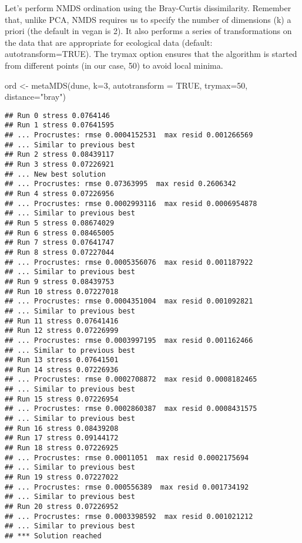 \documentclass[
]{book}
\newenvironment{Shaded}{\begin{snugshade}}{\end{snugshade}}
\newcommand{\AttributeTok}[1]{\textcolor[rgb]{0.77,0.63,0.00}{#1}}
\newcommand{\ConstantTok}[1]{\textcolor[rgb]{0.00,0.00,0.00}{#1}}
\newcommand{\DecValTok}[1]{\textcolor[rgb]{0.00,0.00,0.81}{#1}}
\newcommand{\FunctionTok}[1]{\textcolor[rgb]{0.00,0.00,0.00}{#1}}
\newcommand{\NormalTok}[1]{#1}
\newcommand{\OtherTok}[1]{\textcolor[rgb]{0.56,0.35,0.01}{#1}}
\newcommand{\StringTok}[1]{\textcolor[rgb]{0.31,0.60,0.02}{#1}}
\begin{document}
Let's perform NMDS ordination using the Bray-Curtis dissimilarity. Remember that, unlike PCA, NMDS requires us to specify the number of dimensions (k) a priori (the default in vegan is 2). It also performs a series of transformations on the data that are appropriate for ecological data (default: autotransform=TRUE). The trymax option ensures that the algorithm is started from different points (in our case, 50) to avoid local minima.

\begin{Shaded}
\begin{Highlighting}[]
\NormalTok{ord }\OtherTok{\textless{}{-}} \FunctionTok{metaMDS}\NormalTok{(dune, }\AttributeTok{k=}\DecValTok{3}\NormalTok{, }\AttributeTok{autotransform =} \ConstantTok{TRUE}\NormalTok{, }\AttributeTok{trymax=}\DecValTok{50}\NormalTok{, }\AttributeTok{distance=}\StringTok{"bray"}\NormalTok{)}
\end{Highlighting}
\end{Shaded}

\begin{verbatim}
## Run 0 stress 0.0764146 
## Run 1 stress 0.07641595 
## ... Procrustes: rmse 0.0004152531  max resid 0.001266569 
## ... Similar to previous best
## Run 2 stress 0.08439117 
## Run 3 stress 0.07226921 
## ... New best solution
## ... Procrustes: rmse 0.07363995  max resid 0.2606342 
## Run 4 stress 0.07226956 
## ... Procrustes: rmse 0.0002993116  max resid 0.0006954878 
## ... Similar to previous best
## Run 5 stress 0.08674029 
## Run 6 stress 0.08465005 
## Run 7 stress 0.07641747 
## Run 8 stress 0.07227044 
## ... Procrustes: rmse 0.0005356076  max resid 0.001187922 
## ... Similar to previous best
## Run 9 stress 0.08439753 
## Run 10 stress 0.07227018 
## ... Procrustes: rmse 0.0004351004  max resid 0.001092821 
## ... Similar to previous best
## Run 11 stress 0.07641416 
## Run 12 stress 0.07226999 
## ... Procrustes: rmse 0.0003997195  max resid 0.001162466 
## ... Similar to previous best
## Run 13 stress 0.07641501 
## Run 14 stress 0.07226936 
## ... Procrustes: rmse 0.0002708872  max resid 0.0008182465 
## ... Similar to previous best
## Run 15 stress 0.07226954 
## ... Procrustes: rmse 0.0002860387  max resid 0.0008431575 
## ... Similar to previous best
## Run 16 stress 0.08439208 
## Run 17 stress 0.09144172 
## Run 18 stress 0.07226925 
## ... Procrustes: rmse 0.00011051  max resid 0.0002175694 
## ... Similar to previous best
## Run 19 stress 0.07227022 
## ... Procrustes: rmse 0.000556389  max resid 0.001734192 
## ... Similar to previous best
## Run 20 stress 0.07226952 
## ... Procrustes: rmse 0.0003398592  max resid 0.001021212 
## ... Similar to previous best
## *** Solution reached
\end{verbatim}
\end{document}
